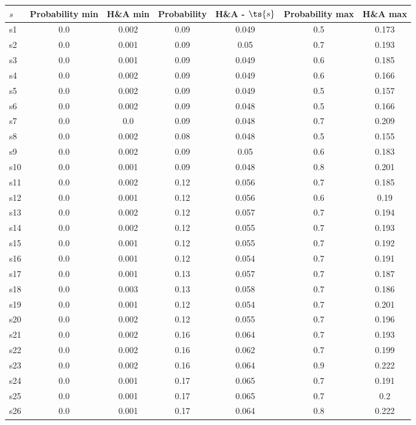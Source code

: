 \documentclass{article}
\begin{document}
\noindent\begin{tabular}{|l|c|c|c|c|c|c|}
\hline
$s$& Probability min & H\&A min & Probability & H\&A - $\ts{s}$ & Probability max & H\&A max\\
\hline
s1 &0.0 & 0.002 & 0.09 & 0.049 & 0.5 & 0.173\\
\hline
s2 &0.0 & 0.001 & 0.09 & 0.05 & 0.7 & 0.193\\
\hline
s3 &0.0 & 0.001 & 0.09 & 0.049 & 0.6 & 0.185\\
\hline
s4 &0.0 & 0.002 & 0.09 & 0.049 & 0.6 & 0.166\\
\hline
s5 &0.0 & 0.002 & 0.09 & 0.049 & 0.5 & 0.157\\
\hline
s6 &0.0 & 0.002 & 0.09 & 0.048 & 0.5 & 0.166\\
\hline
s7 &0.0 & 0.0 & 0.09 & 0.048 & 0.7 & 0.209\\
\hline
s8 &0.0 & 0.002 & 0.08 & 0.048 & 0.5 & 0.155\\
\hline
s9 &0.0 & 0.002 & 0.09 & 0.05 & 0.6 & 0.183\\
\hline
s10 &0.0 & 0.001 & 0.09 & 0.048 & 0.8 & 0.201\\
\hline
s11 &0.0 & 0.002 & 0.12 & 0.056 & 0.7 & 0.185\\
\hline
s12 &0.0 & 0.001 & 0.12 & 0.056 & 0.6 & 0.19\\
\hline
s13 &0.0 & 0.002 & 0.12 & 0.057 & 0.7 & 0.194\\
\hline
s14 &0.0 & 0.002 & 0.12 & 0.055 & 0.7 & 0.193\\
\hline
s15 &0.0 & 0.001 & 0.12 & 0.055 & 0.7 & 0.192\\
\hline
s16 &0.0 & 0.001 & 0.12 & 0.054 & 0.7 & 0.191\\
\hline
s17 &0.0 & 0.001 & 0.13 & 0.057 & 0.7 & 0.187\\
\hline
s18 &0.0 & 0.003 & 0.13 & 0.058 & 0.7 & 0.186\\
\hline
s19 &0.0 & 0.001 & 0.12 & 0.054 & 0.7 & 0.201\\
\hline
s20 &0.0 & 0.002 & 0.12 & 0.055 & 0.7 & 0.196\\
\hline
s21 &0.0 & 0.002 & 0.16 & 0.064 & 0.7 & 0.193\\
\hline
s22 &0.0 & 0.002 & 0.16 & 0.062 & 0.7 & 0.199\\
\hline
s23 &0.0 & 0.002 & 0.16 & 0.064 & 0.9 & 0.222\\
\hline
s24 &0.0 & 0.001 & 0.17 & 0.065 & 0.7 & 0.191\\
\hline
s25 &0.0 & 0.001 & 0.17 & 0.065 & 0.7 & 0.2\\
\hline
s26 &0.0 & 0.001 & 0.17 & 0.064 & 0.8 & 0.222\\

\end{tabular}
\end{document}

